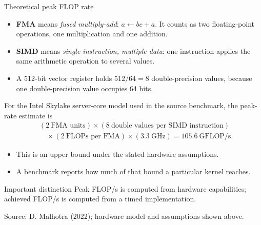 \documentclass[aspectratio=169,11pt]{beamer}
\begin{document}
\begin{frame}{Theoretical peak FLOP rate}
\small
\footnotesize
\begin{itemize}\setlength{\itemsep}{0pt}
  \item \textbf{FMA} means \emph{fused multiply-add}: $a\leftarrow bc+a$.
        It counts as two floating-point operations, one multiplication and one
        addition.
  \item \textbf{SIMD} means \emph{single instruction, multiple data}: one
        instruction applies the same arithmetic operation to several values.
  \item A 512-bit vector register holds $512/64=8$ double-precision values,
        because one double-precision value occupies 64 bits.
\end{itemize}

For the Intel Skylake server-core model used in the source benchmark, the
peak-rate estimate is
\[
  \begin{aligned}
  &(2\ \text{FMA units})
  \times(8\ \text{double values per SIMD instruction})\\[-1mm]
  &\quad\times(2\ \text{FLOPs per FMA})
  \times(3.3\ \text{GHz})
  =105.6\ \text{GFLOP/s}.
  \end{aligned}
\]
\small
\begin{itemize}\setlength{\itemsep}{0pt}
  \item This is an upper bound under the stated hardware assumptions.
  \item A benchmark reports how much of that bound a particular kernel reaches.
\end{itemize}
\begin{block}{Important distinction}
Peak FLOP/s is computed from hardware capabilities; achieved FLOP/s is
computed from a timed implementation.
\end{block}
\vspace{-0.45em}
\tiny Source: D. Malhotra (2022); hardware model and assumptions shown above.
\end{frame}
\end{document}
